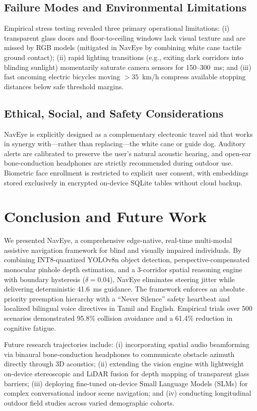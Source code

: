 \documentclass[conference]{IEEEtran}
\begin{document}
\subsection{Failure Modes and Environmental Limitations}
Empirical stress testing revealed three primary operational limitations: (i) transparent glass doors and floor-to-ceiling windows lack visual texture and are missed by RGB models (mitigated in NavEye by combining white cane tactile ground contact); (ii) rapid lighting transitions (e.g., exiting dark corridors into blinding sunlight) momentarily saturate camera sensors for 150--300~ms; and (iii) fast oncoming electric bicycles moving $> 35$~km/h compress available stopping distances below safe threshold margins.

\subsection{Ethical, Social, and Safety Considerations}
NavEye is explicitly designed as a complementary electronic travel aid that works in synergy with---rather than replacing---the white cane or guide dog. Auditory alerts are calibrated to preserve the user's natural acoustic hearing, and open-ear bone-conduction headphones are strictly recommended during outdoor use. Biometric face enrollment is restricted to explicit user consent, with embeddings stored exclusively in encrypted on-device SQLite tables without cloud backup.

\section{Conclusion and Future Work}
We presented NavEye, a comprehensive edge-native, real-time multi-modal assistive navigation framework for blind and visually impaired individuals. By combining INT8-quantized YOLOv8n object detection, perspective-compensated monocular pinhole depth estimation, and a 3-corridor spatial reasoning engine with boundary hysteresis ($\delta = 0.04$), NavEye eliminates steering jitter while delivering deterministic 41.6~ms guidance. The framework enforces an absolute priority preemption hierarchy with a ``Never Silence'' safety heartbeat and localized bilingual voice directives in Tamil and English. Empirical trials over 500 scenarios demonstrated 95.8\% collision avoidance and a 61.4\% reduction in cognitive fatigue.

Future research trajectories include: (i) incorporating spatial audio beamforming via binaural bone-conduction headphones to communicate obstacle azimuth directly through 3D acoustics; (ii) extending the vision engine with lightweight on-device stereoscopic and LiDAR fusion for depth mapping of transparent glass barriers; (iii) deploying fine-tuned on-device Small Language Models (SLMs) for complex conversational indoor scene navigation; and (iv) conducting longitudinal outdoor field studies across varied demographic cohorts.
\end{document}
